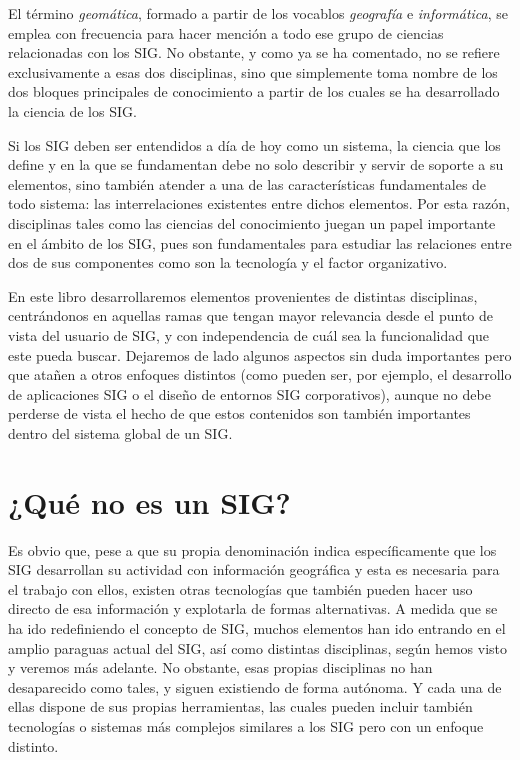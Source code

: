 El término \emph{geomática}, formado a partir de los vocablos \emph{geografía} e \emph{informática}, se emplea con frecuencia para hacer mención a todo ese grupo de ciencias relacionadas con los SIG. No obstante, y como ya se ha comentado, no se refiere exclusivamente a esas dos disciplinas, sino que simplemente toma nombre de los dos bloques principales de conocimiento a partir de los cuales se ha desarrollado la ciencia de los SIG.

Si los SIG deben ser entendidos a día de hoy como un sistema, la ciencia que los define y en la que se fundamentan debe no solo describir y servir de soporte a su elementos, sino también atender a una de las características fundamentales de todo sistema: las interrelaciones existentes entre dichos elementos. Por esta razón, disciplinas tales como las ciencias del conocimiento juegan un papel importante en el ámbito de los SIG, pues son fundamentales para estudiar las relaciones entre dos de sus componentes como son la tecnología y el factor organizativo. 

En este libro desarrollaremos elementos provenientes de distintas disciplinas, centrándonos en aquellas ramas que tengan mayor relevancia desde el punto de vista del usuario de SIG, y con independencia de cuál sea la funcionalidad que este pueda buscar. Dejaremos de lado algunos aspectos sin duda importantes pero que atañen a otros enfoques distintos (como pueden ser, por ejemplo, el desarrollo de aplicaciones SIG o el diseño de entornos SIG corporativos), aunque no debe perderse de vista el hecho de que estos contenidos son también importantes dentro del sistema global de un SIG.

\section {¿Qué no es un SIG?}

Es obvio que, pese a que su propia denominación indica específicamente que los SIG desarrollan su actividad con información geográfica y esta es necesaria para el trabajo con ellos, existen otras tecnologías que también pueden hacer uso directo de esa información y explotarla de formas alternativas. A medida que se ha ido redefiniendo el concepto de SIG, muchos elementos han ido entrando en el amplio paraguas actual del SIG, así como distintas disciplinas, según hemos visto y veremos más adelante. No obstante, esas propias disciplinas no han desaparecido como tales, y siguen existiendo de forma autónoma. Y cada una de ellas dispone de sus propias herramientas, las cuales pueden incluir también tecnologías o sistemas más complejos similares a los SIG pero con un enfoque distinto.

